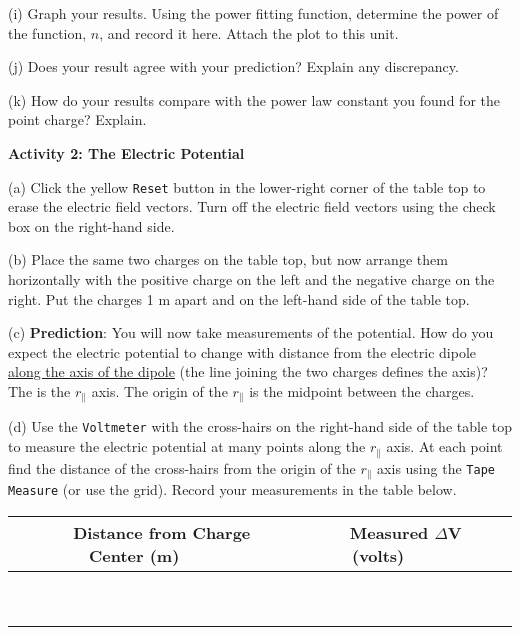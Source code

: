 (i) Graph your results. Using the power fitting
function, determine the power of the function, $n$, and record it here.
Attach the plot to this unit.
\vspace{15mm}

(j) Does your result agree with your prediction? Explain any discrepancy.\vspace{15mm}

(k) How do your results compare with the power law constant you found
for the point charge? Explain.\vspace{15mm}


\textbf{Activity 2: The Electric Potential}

(a) Click the yellow {\tt Reset} button in the lower-right corner of the table top
to erase the electric field vectors. 
Turn off the electric field vectors using the check box on the right-hand side.

(b) Place the same two charges on the table top, but now arrange them horizontally with the
positive charge on the left and the negative charge on the right.
Put the charges 1 m apart and on the left-hand side of the table top.

(c) \textbf{Prediction}: You will now take measurements of the potential.
How do you expect the electric potential to change with distance from the 
electric dipole \underline{along the axis of the dipole} (the line joining 
the two charges defines the axis)?
The is the $r_\parallel$ axis.
The origin of the $r_\parallel$ is the midpoint between the charges.
\vspace{15mm}
 
(d) Use the {\tt Voltmeter} with the cross-hairs on the right-hand side of the table top
to measure the electric potential at many points along the $r_\parallel$ axis.
At each point find the distance of the cross-hairs from the origin of the $r_\parallel$ axis using
the {\tt Tape Measure} (or use the grid).
Record your measurements in the table below.

\vspace{0.3cm}
{\centering \begin{tabular}{|c|c|c|}
\hline 
~~~Distance from Charge Center (m)~~~&
~~~Measured \( \Delta  \)V (volts)~~~\\
\hline
\hline 
&
\\
\hline 
&
\\
\hline 
&
\\
\hline 
&
\\
\hline 
&
\\
\hline 
&
\\
\hline 
&
\\
\hline 
&
\\
\hline 
&
\\
\hline
\end{tabular}\par}
\vspace{0.3cm}


